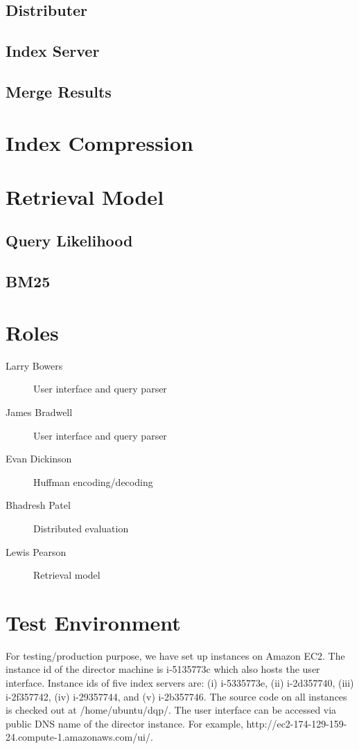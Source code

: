 \documentclass[letterpaper,11pt,twoside]{article}
\begin{document}
\subsection{Distributer}

\subsection{Index Server}

\subsection{Merge Results}

\section{Index Compression}

\section{Retrieval Model}

\subsection{Query Likelihood}

\subsection{BM25}

\section{Roles}
\begin{description}
  \item[Larry Bowers] User interface and query parser
  \item[James Bradwell] User interface and query parser
  \item[Evan Dickinson] Huffman encoding/decoding 
  \item[Bhadresh Patel] Distributed evaluation
  \item[Lewis Pearson] Retrieval model
\end{description}

\section{Test Environment}

For testing/production purpose, we have set up instances on Amazon EC2. The instance id of the director machine is i-5135773c which also hosts the user interface. Instance ids of five index servers are: (i) i-5335773e, (ii) i-2d357740, (iii) i-2f357742, (iv) i-29357744, and (v) i-2b357746. The source code on all instances is checked out at /home/ubuntu/dqp/. The user interface can be accessed via public DNS name of the director instance. For example, http://ec2-174-129-159-24.compute-1.amazonaws.com/ui/.
\end{document}
